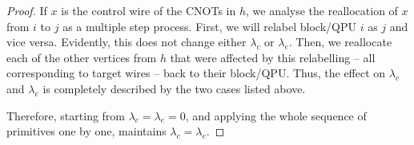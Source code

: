 \begin{proof}
If \(x\) is the control wire of the CNOTs in \(h\), we analyse the reallocation of \(x\) from \(i\) to \(j\) as a multiple step process. First, we will relabel block/QPU \(i\) as \(j\) and vice versa. Evidently, this does not change either \(\lambda_c\) or \(\lambda_e\). Then, we reallocate each of the other vertices from \(h\) that were affected by this relabelling -- all corresponding to target wires -- back to their block/QPU. Thus, the effect on \(\lambda_c\) and \(\lambda_e\) is completely described by the two cases listed above.

Therefore, starting from \(\lambda_c = \lambda_e = 0\), and applying the whole sequence of primitives one by one, maintains \(\lambda_c = \lambda_e\).

\end{proof}

\begin{comment}
\begin{algorithm}[caption={Builds the distributed circuit determined by the input hypergraph partition. The hypergraph partition is provided as an assignment \(qpuOf \colon \mathbb{N} \to \mathbb{N}\) which indicates the QPU number of the given wire},label={code:distributeVanilla}]
input: circuit, $qpuOf$
output: distributed
begin
  distributed $\gets$ $emptyCircuit$
  foreach wire in circuit do
    thisQPU = $qpuOf$(wire)
    activeConnections $\gets$ $\varnothing$
    foreach gate in wire do
      if gate == CNOT and $controlOf$(gate) == wire then
        targetQPU = $qpuOf$($targetOf$(gate))
        if targetQPU == thisQPU then
          distributed.$addCNOTAt$(wire,target)
        else
          ebit $\gets$ activeConnections.$at$(targetQPU)
          if ebit == null then
            ebit $\gets$ $distillEbit$(thisQPU, targetQPU)
            distributed.$addCatEntangler$(ebit, wire)
            activeConnections.$at$(targetQPU) $\gets$ ebit
          distributed.$addCNOTAt$(ebit,$targetOf$(gate))
      else
        distributed.$addGateAt$(gate,wire)
end
\end{algorithm}
\end{comment}


